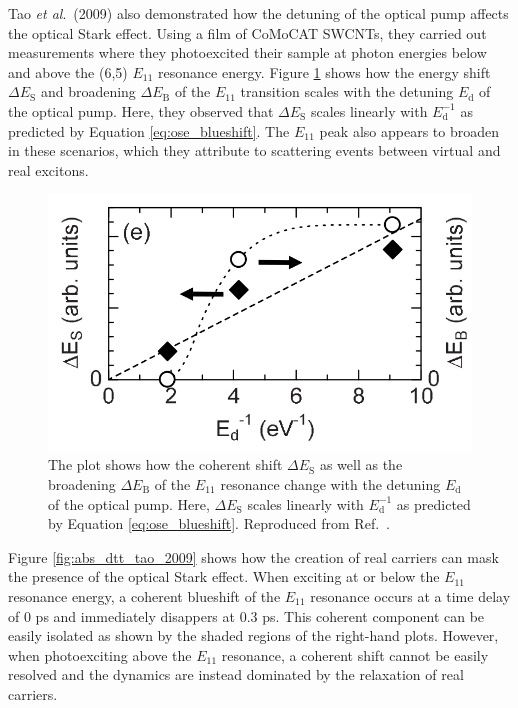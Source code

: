Tao \textit{et al}.\ (2009) also demonstrated how the detuning of the optical pump affects the optical Stark effect. Using a film of CoMoCAT SWCNTs, they carried out measurements where they photoexcited their sample at photon energies below and above the (6,5) $E_{11}$ resonance energy. Figure \ref{fig:detuning_tao_2009} shows how the energy shift $\Delta E_\text{S}$ and broadening $\Delta E_\text{B}$ of the $E_{11}$ transition scales with the detuning $E_\text{d}$ of the optical pump. Here, they observed that $\Delta E_\text{S}$ scales linearly with $E_\text{d}^{-1}$ as predicted by Equation \eqref{eq:ose_blueshift}. The $E_{11}$ peak also appears to broaden in these scenarios, which they attribute to scattering events between virtual and real excitons.

\begin{figure}[ht]
	\centering
	\includegraphics[scale=0.35]{images/chapter_prior_works/fluence_tao_2009}
	\caption{The plot shows how the coherent shift $\Delta E_\text{S}$ as well as the broadening $\Delta E_\text{B}$ of the $E_{11}$ resonance change with the detuning $E_\text{d}$ of the optical pump. Here, $\Delta E_\text{S}$ scales linearly with $E_\text{d}^{-1}$ as predicted by Equation \eqref{eq:ose_blueshift}. Reproduced from Ref.\ \cite{tao2009subpicosecond}.}
	\label{fig:detuning_tao_2009}
\end{figure}

Figure \ref{fig:abs_dtt_tao_2009} shows how the creation of real carriers can mask the presence of the optical Stark effect. When exciting at or below the $E_{11}$ resonance energy, a coherent blueshift of the $E_{11}$ resonance occurs at a time delay of 0 ps and immediately disappers at 0.3 ps. This coherent component can be easily isolated as shown by the shaded regions of the right-hand plots. However, when photoexciting above the $E_{11}$ resonance, a coherent shift cannot be easily resolved and the dynamics are instead dominated by the relaxation of real carriers.

